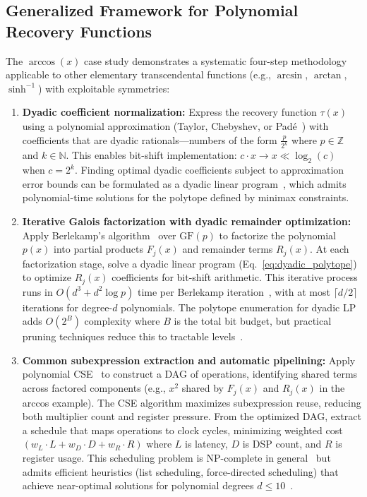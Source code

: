 \subsection{Generalized Framework for Polynomial Recovery Functions}

The $\arccos(x)$ case study demonstrates a systematic four-step methodology applicable to other elementary transcendental functions (e.g., $\arcsin$, $\arctan$, $\sinh^{-1}$) with exploitable symmetries:

\begin{enumerate}
    \item \textbf{Dyadic coefficient normalization:} Express the recovery function $\tau(x)$ using a polynomial approximation (Taylor, Chebyshev, or Padé~\cite{Parks1987,Muller2006}) with coefficients that are dyadic rationals—numbers of the form $\frac{p}{2^k}$ where $p \in \mathbb{Z}$ and $k \in \mathbb{N}$. This enables bit-shift implementation: $c \cdot x \to x \ll \log_2(c)$ when $c = 2^k$. Finding optimal dyadic coefficients subject to approximation error bounds can be formulated as a dyadic linear program~\cite{Abdi2024}, which admits polynomial-time solutions for the polytope defined by minimax constraints.

    \item \textbf{Iterative Galois factorization with dyadic remainder optimization:} Apply Berlekamp's algorithm~\cite{berlekamp1970factoring} over $\mathrm{GF}(p)$ to factorize the polynomial $p(x)$ into partial products $F_j(x)$ and remainder terms $R_j(x)$. At each factorization stage, solve a dyadic linear program (Eq.~\eqref{eq:dyadic_polytope}) to optimize $R_j(x)$ coefficients for bit-shift arithmetic. This iterative process runs in $O(d^3 + d^2 \log p)$ time per Berlekamp iteration~\cite{gathen2013modern}, with at most $\lceil d/2 \rceil$ iterations for degree-$d$ polynomials. The polytope enumeration for dyadic LP adds $O(2^B)$ complexity where $B$ is the total bit budget, but practical pruning techniques reduce this to tractable levels~\cite{Abdi2024}.

    \item \textbf{Common subexpression extraction and automatic pipelining:} Apply polynomial CSE~\cite{Mehdizadeh2004,Gustafsson2007} to construct a DAG of operations, identifying shared terms across factored components (e.g., $x^2$ shared by $F_j(x)$ and $R_j(x)$ in the arccos example). The CSE algorithm maximizes subexpression reuse, reducing both multiplier count and register pressure. From the optimized DAG, extract a schedule that maps operations to clock cycles, minimizing weighted cost $(w_L \cdot L + w_D \cdot D + w_R \cdot R)$ where $L$ is latency, $D$ is DSP count, and $R$ is register usage. This scheduling problem is NP-complete in general~\cite{Mehdizadeh2004} but admits efficient heuristics (list scheduling, force-directed scheduling) that achieve near-optimal solutions for polynomial degrees $d \leq 10$~\cite{Gustafsson2007}.


\end{enumerate}
